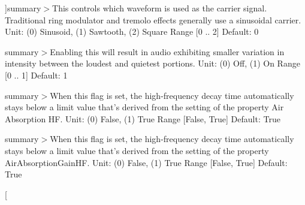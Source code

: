 \begin{Desc}
\begin{description}
{}]summary$>$This controls which waveform is used as the carrier signal. Traditional ring modulator and tremolo effects generally use a sinusoidal carrier. Unit\-: (0) Sinusoid, (1) Sawtooth, (2) Square Range \mbox{[}0 .. 2\mbox{]} Default\-: 0\item[{\em 
\hypertarget{namespace_open_t_k_1_1_audio_1_1_open_a_l_a49039c1ddcb53675576ad2780fc50315ac8549df97c5cf6e58d3ee3ba4bd1b22c}{Ring\-Modulator\-Waveform}\label{namespace_open_t_k_1_1_audio_1_1_open_a_l_a49039c1ddcb53675576ad2780fc50315ac8549df97c5cf6e58d3ee3ba4bd1b22c}
}]summary$>$Enabling this will result in audio exhibiting smaller variation in intensity between the loudest and quietest portions. Unit\-: (0) Off, (1) On Range \mbox{[}0 .. 1\mbox{]} Default\-: 1\item[{\em 
\hypertarget{namespace_open_t_k_1_1_audio_1_1_open_a_l_a49039c1ddcb53675576ad2780fc50315a6ae6a251fe23f9192a6e6f752f13e442}{Compressor\-Onoff}\label{namespace_open_t_k_1_1_audio_1_1_open_a_l_a49039c1ddcb53675576ad2780fc50315a6ae6a251fe23f9192a6e6f752f13e442}
}]summary$>$When this flag is set, the high-\/frequency decay time automatically stays below a limit value that's derived from the setting of the property Air Absorption H\-F. Unit\-: (0) False, (1) True Range \mbox{[}False, True\mbox{]} Default\-: True\item[{\em 
\hypertarget{namespace_open_t_k_1_1_audio_1_1_open_a_l_a49039c1ddcb53675576ad2780fc50315a34438d64d0ae5f59d0012931f284f9da}{Reverb\-Decay\-H\-F\-Limit}\label{namespace_open_t_k_1_1_audio_1_1_open_a_l_a49039c1ddcb53675576ad2780fc50315a34438d64d0ae5f59d0012931f284f9da}
}]summary$>$When this flag is set, the high-\/frequency decay time automatically stays below a limit value that's derived from the setting of the property Air\-Absorption\-Gain\-H\-F. Unit\-: (0) False, (1) True Range \mbox{[}False, True\mbox{]} Default\-: True\item[{\em 
}
\end{description}
\end{Desc}
